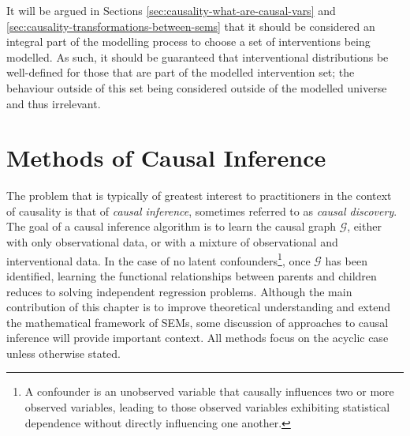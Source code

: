 It will be argued in Sections \ref{sec:causality-what-are-causal-vars} and \ref{sec:causality-transformations-between-sems} that it should be considered an integral part of the modelling process to choose a set of interventions being modelled. As such, it should be guaranteed that interventional distributions be well-defined for those that are part of the modelled intervention set; the behaviour outside of this set being considered outside of the modelled universe and thus irrelevant.


\section{Methods of Causal Inference}\label{section:causality-causal-inference}
The problem that is typically of greatest interest to practitioners in the context of causality is that of \emph{causal inference}, sometimes referred to as \emph{causal discovery}.
The goal of a causal inference algorithm is to learn the causal graph $\mathcal{G}$, 
either with only observational data, or with a mixture of observational and interventional data.
In the case of no latent confounders\footnote{A confounder is an unobserved variable that causally influences two or more observed variables, leading to those observed variables exhibiting statistical dependence without directly influencing one another.}, once $\mathcal{G}$ has been identified, learning the functional relationships between parents and children reduces to solving independent regression problems. 
Although the main contribution of this chapter is to improve theoretical understanding and extend the mathematical framework of SEMs, some discussion of approaches to causal inference will provide important context.
All methods focus on the acyclic case unless otherwise stated.

